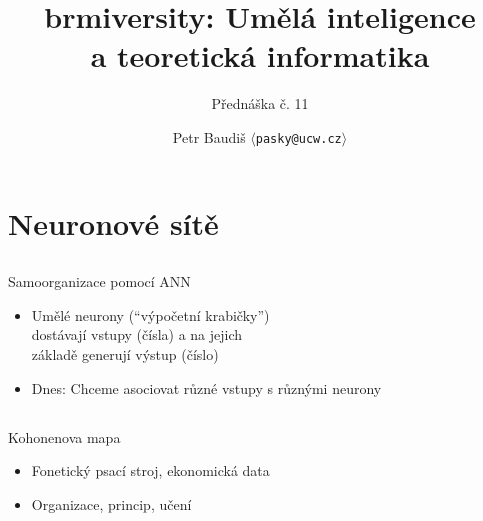 \documentclass{beamer}
\begin{document}

\title{brmiversity: Umělá inteligence \\ a teoretická informatika}
\subtitle{Přednáška č. 11}
\author{Petr Baudiš $\langle${\tt pasky@ucw.cz}$\rangle$}
\date{}
\frame{\titlepage}

\section{Neuronové sítě}

\subsection{}
\begin{frame}{Samoorganizace pomocí ANN}
\begin{itemize}
\item Umělé neurony (``výpočetní krabičky'') \\ dostávají vstupy (čísla) a na jejich \\ základě generují výstup (číslo)
\item Dnes: Chceme asociovat různé vstupy s různými neurony
\end{itemize}
\end{frame}

\subsection{}
\begin{frame}{Kohonenova mapa}
\begin{itemize}
\item Fonetický psací stroj, ekonomická data
\item Organizace, princip, učení
\end{itemize}
\end{frame}
\end{document}
